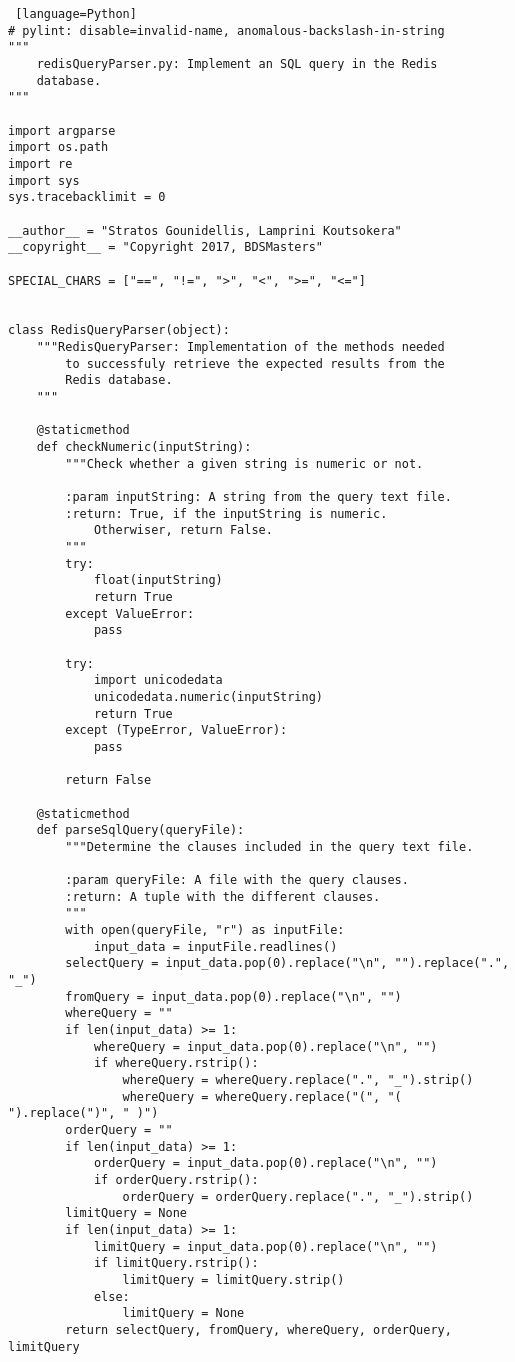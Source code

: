 \documentclass[11pt]{article}
\begin{document}
\begin{lstlisting} [language=Python]
# pylint: disable=invalid-name, anomalous-backslash-in-string
"""
    redisQueryParser.py: Implement an SQL query in the Redis
    database.
"""

import argparse
import os.path
import re
import sys
sys.tracebacklimit = 0

__author__ = "Stratos Gounidellis, Lamprini Koutsokera"
__copyright__ = "Copyright 2017, BDSMasters"

SPECIAL_CHARS = ["==", "!=", ">", "<", ">=", "<="]


class RedisQueryParser(object):
    """RedisQueryParser: Implementation of the methods needed
        to successfuly retrieve the expected results from the
        Redis database.
    """

    @staticmethod
    def checkNumeric(inputString):
        """Check whether a given string is numeric or not.

        :param inputString: A string from the query text file.
        :return: True, if the inputString is numeric.
            Otherwiser, return False.
        """
        try:
            float(inputString)
            return True
        except ValueError:
            pass

        try:
            import unicodedata
            unicodedata.numeric(inputString)
            return True
        except (TypeError, ValueError):
            pass

        return False

    @staticmethod
    def parseSqlQuery(queryFile):
        """Determine the clauses included in the query text file.

        :param queryFile: A file with the query clauses.
        :return: A tuple with the different clauses.
        """
        with open(queryFile, "r") as inputFile:
            input_data = inputFile.readlines()
        selectQuery = input_data.pop(0).replace("\n", "").replace(".", "_")
        fromQuery = input_data.pop(0).replace("\n", "")
        whereQuery = ""
        if len(input_data) >= 1:
            whereQuery = input_data.pop(0).replace("\n", "")
            if whereQuery.rstrip():
                whereQuery = whereQuery.replace(".", "_").strip()
                whereQuery = whereQuery.replace("(", "( ").replace(")", " )")
        orderQuery = ""
        if len(input_data) >= 1:
            orderQuery = input_data.pop(0).replace("\n", "")
            if orderQuery.rstrip():
                orderQuery = orderQuery.replace(".", "_").strip()
        limitQuery = None
        if len(input_data) >= 1:
            limitQuery = input_data.pop(0).replace("\n", "")
            if limitQuery.rstrip():
                limitQuery = limitQuery.strip()
            else:
                limitQuery = None
        return selectQuery, fromQuery, whereQuery, orderQuery, limitQuery


\end{lstlisting}
\end{document}
